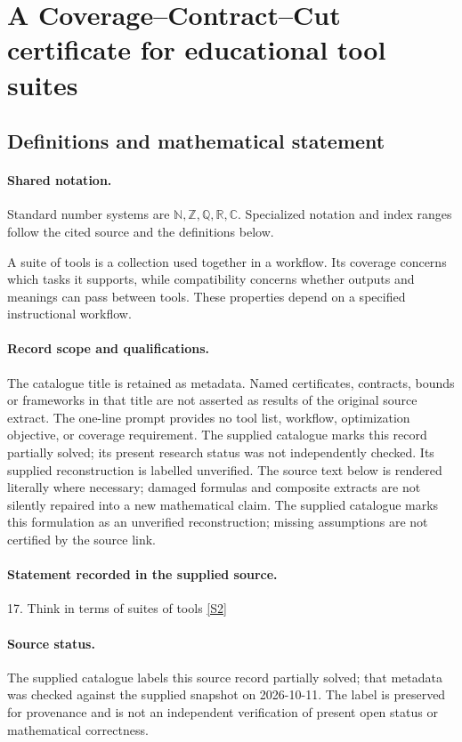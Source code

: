 \documentclass[11pt]{article}
\newcommand{\sref}[2]{\hyperlink{source:#1:#2}{[S#2]}}
\begin{document}
\section{A Coverage--Contract--Cut certificate for educational tool suites}\label{statement}

\subsection{Definitions and mathematical statement}

\paragraph{Shared notation.}Standard number systems are $\mathbb N,\mathbb Z,\mathbb Q,\mathbb R,\mathbb C$. Specialized notation and index ranges follow the cited source and the definitions below.


A suite of tools is a collection used together in a workflow. Its coverage concerns which tasks it supports, while compatibility concerns whether outputs and meanings can pass between tools. These properties depend on a specified instructional workflow.
\paragraph{Record scope and qualifications.}
The catalogue title is retained as metadata. Named certificates, contracts, bounds or frameworks in that title are not asserted as results of the original source extract.
The one-line prompt provides no tool list, workflow, optimization objective, or coverage requirement. The supplied catalogue marks this record partially solved; its present research status was not independently checked. Its supplied reconstruction is labelled unverified.
The source text below is rendered literally where necessary; damaged formulas and composite extracts are not silently repaired into a new mathematical claim.
The supplied catalogue marks this formulation as an unverified reconstruction; missing assumptions are not certified by the source link.
\paragraph{Statement recorded in the supplied source.}
17. Think in terms of suites of tools \sref{statement}{2}
\paragraph{Source status.}
The supplied catalogue labels this source record partially solved; that metadata was checked against the supplied snapshot on 2026-10-11. The label is preserved for provenance and is not an independent verification of present open status or mathematical correctness.
\end{document}
